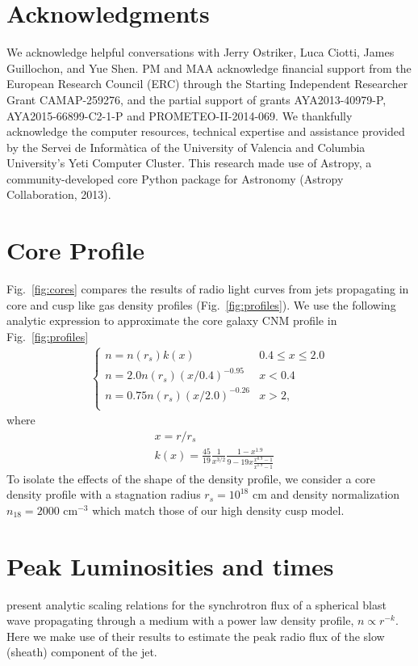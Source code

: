 \documentclass[usenatbib,fleqn]{mnras}
\begin{document}
\section*{Acknowledgments}
We acknowledge helpful conversations with Jerry Ostriker, Luca Ciotti,
James Guillochon, and Yue Shen. PM and MAA acknowledge financial
support from the European Research Council (ERC) through the Starting
Independent Researcher Grant CAMAP-259276, and the partial support of
grants AYA2013-40979-P, AYA2015-66899-C2-1-P and
PROMETEO-II-2014-069. We thankfully acknowledge the computer
resources, technical expertise and assistance provided by the Servei
de Inform\`atica of the University of Valencia and Columbia
University's Yeti Computer Cluster. This research made use of Astropy,
a community-developed core Python package for Astronomy (Astropy
Collaboration, 2013).

\appendix
\section{Core Profile}
\label{app:core}
Fig.~\ref{fig:cores} compares the results of radio light curves from
jets propagating in core and cusp like gas density profiles
(Fig.~\ref{fig:profiles}).  We use the following analytic expression
to approximate the core galaxy CNM profile in Fig.~\ref{fig:profiles}
\begin{align}
\begin{cases}
n=n(r_s) k(x) & 0.4 \leq x\leq 2.0\\
n = 2.0 n(r_s) (x/0.4)^{-0.95} & x < 0.4\\
n = 0.75 n(r_s) (x/2.0)^{-0.26} & x>2,\\
\end{cases}
\label{eq:cores}
\end{align}
where
\begin{align}
  &x=r/r_s\\\nonumber
  &k(x)=\frac{45}{19} \frac{1}{x^{3/2}} \frac{1-x^{1.9}}{9-19
      x\frac{x^{0.9}-1}{x^{1.9}-1}}
\end{align}
To isolate the effects of the shape of the density profile, we
consider a core density profile with a stagnation radius $r_s=10^{18}$
cm and density normalization $n_{18}=2000$ cm$^{-3}$ which match those
of our high density cusp model.

\section{Peak Luminosities and times}
\label{app:analyt}
\citet{Leventis+2012} present analytic scaling relations for the
synchrotron flux of a spherical blast wave propagating through a
medium with a power law density profile, $n\propto r^{-k}$.  Here we
make use of their results to estimate the peak radio flux of the slow
(sheath) component of the jet.
\end{document}
